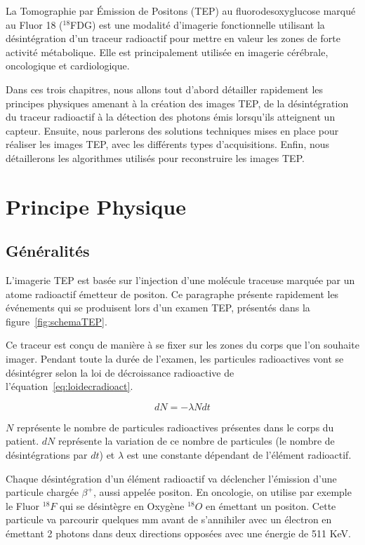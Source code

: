 
\label{lab:chapPET}
La Tomographie par \'Emission de Positons (TEP) au fluorodesoxyglucose marqué au Fluor 18 ($^{18}$FDG) est une modalité d'imagerie fonctionnelle utilisant la désintégration d'un traceur radioactif pour mettre en valeur les zones de forte activité métabolique. Elle est principalement utilisée en imagerie cérébrale, oncologique et cardiologique.


Dans ces trois chapitres, nous allons tout d'abord détailler rapidement les principes physiques amenant à la création des images TEP, de la désintégration du traceur radioactif à la détection des photons émis lorsqu'ils atteignent un capteur. Ensuite, nous parlerons des solutions techniques mises en place pour réaliser les images TEP, avec les différents types d'acquisitions. Enfin, nous détaillerons les algorithmes utilisés pour reconstruire les images TEP.

 
\chapter{Principe Physique}

	\section{Généralités}

L'imagerie TEP est basée sur l'injection d'une molécule traceuse marquée par un atome radioactif émetteur de positon. Ce paragraphe présente rapidement les événements qui se produisent lors d'un examen TEP, présentés dans la figure~\ref{fig:schemaTEP}.

Ce traceur est conçu de manière à se fixer sur les zones du corps que l'on souhaite imager. Pendant toute la durée de l'examen, les particules radioactives vont se désintégrer selon la loi de décroissance radioactive de l'équation~\ref{eq:loidecradioact}.

\begin{equation}
	dN = - \lambda N dt
	\label{eq:loidecradioact}
\end{equation}

$N$ représente le nombre de particules radioactives présentes dans le corps du patient. $dN$ représente la variation de ce nombre de particules (le nombre de désintégrations par $dt$) et $\lambda$ est une constante dépendant de l'élément radioactif.

Chaque désintégration d'un élément radioactif va déclencher l'émission d'une particule chargée $\beta^+$, aussi appelée positon. En oncologie, on utilise par exemple le Fluor $^{18}F$ qui se désintègre en Oxygène $^{18}O$ en émettant un positon. Cette particule va parcourir quelques mm avant de s'annihiler avec un électron en émettant 2 photons dans deux directions opposées avec une énergie de 511 KeV.

